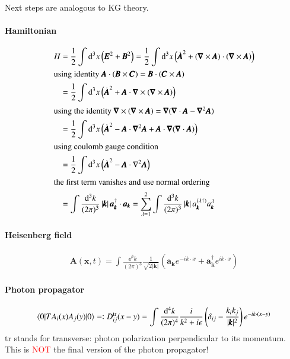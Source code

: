 Next steps are analogous to KG theory. 
\paragraph{Hamiltonian}
\begin{align*}
	H &= \frac{1}{2} \int \dd^3 x \left(\pmb{E}^2 + \pmb{B}^2 \right)= \frac{1}{2} \int \dd^3 x \left( \dot{\pmb{A}}^2 + (\pmb{\nabla} \times \pmb{A})\cdot (\pmb{\nabla} \times \pmb{A}) \right) \\
	\shortintertext{using identity $\pmb{A}\cdot(\pmb{B}\times\pmb{C}) = \pmb{B}\cdot(\pmb{C}\times\pmb{A})$}
	  &= \frac{1}{2} \int \dd^3 x \left( \dot{\pmb{A}}^2 + \pmb{A}\cdot\pmb{\nabla}\times(\pmb{\nabla} \times \pmb{A})\right) \\
	  \shortintertext{using the identity $\pmb{\nabla}\times(\pmb{\nabla}\times\pmb{A}) = \pmb{\nabla}(\pmb{\nabla}\cdot\pmb{A} - \pmb{\nabla}^2\pmb{A})$}
	  &= \frac{1}{2} \int \dd^3 x \left( \dot{\pmb{A}}^2 -\pmb{A}\cdot\pmb{\nabla}^2\pmb{A}+\pmb{A}\cdot\pmb{\nabla}(\pmb{\nabla}\cdot\pmb{A})  \right) \\
	\shortintertext{using coulomb gauge condition}
	  &= \frac{1}{2} \int \dd^3 x \left( \dot{\pmb{A}}^2 - \pmb{A}\cdot \nabla^2\pmb{A} \right) \\
	  \shortintertext{the first term vanishes and use normal ordering}
	  &= \int \frac{\dd^3 k}{(2\pi)^3} \left|\pmb{k} \right| \pmb{a}_{\pmb{k}}^\dagger \cdot \pmb{a}_{\pmb{k}} = \sum_{\lambda=1}^2 \int \frac{\dd^3 k}{(2\pi)^3} \left|\pmb{k} \right| a_{\pmb{k}}^{(\lambda \dagger)} a_{\pmb{k}}^{\lambda}
\end{align*} 

\paragraph{Heisenberg field}
\begin{align*}
	\pmb{A}(\pmb{x},t) = \int \frac{\dd^3 k}{(2\pi)^3}\frac{1}{\sqrt{2|\pmb{k}|}} \left( \pmb{a}_{\pmb{k}} e^{-ik\cdot x} +  \pmb{a}_{\pmb{k}}^\dagger e^{ik\cdot x}\right)
\end{align*}

\paragraph{Photon propagator}
\begin{align}
	\braket{0 | T A_i (x) A_j (y) | 0} = \vcentcolon D^{\text{tr}}_{ij} (x-y) = \int\frac{\dd^4 k}{(2\pi)^4}	
\frac{i}{k^2 + i\epsilon} \left( \delta_{ij} - \frac{k_i k_j}{|\pmb{k}|^2} \right)e^{-ik\cdot(x-y)}
\end{align}
$\text{tr}$ stands for transverse: photon polarization perpendicular to its momentum. This is \textcolor{red}{NOT} the final version of the photon propagator!

